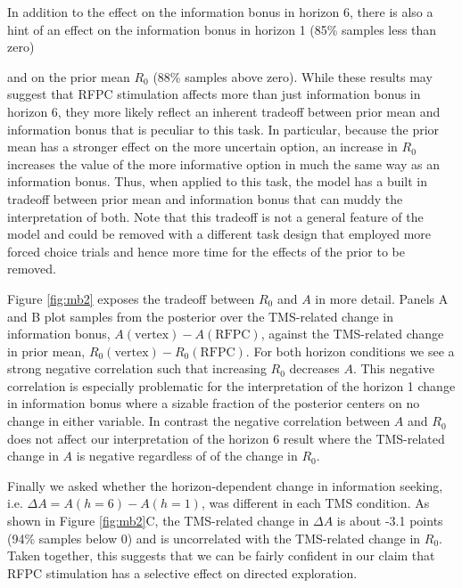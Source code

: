 \documentclass[12pt]{article}
\begin{document}
In addition to the effect on the information bonus in horizon 6, there is also a hint of an effect on the information bonus in horizon 1 (85\% samples less than zero) {\color{red} and on the prior mean $R_0$ (88\% samples above zero). While these results may suggest that RFPC stimulation affects more than just information bonus in horizon 6, they more likely reflect an inherent tradeoff between prior mean and information bonus that is peculiar to this task.  In particular, because the prior mean has a stronger effect on the more uncertain option, an increase in $R_0$ increases the value of the more informative option in much the same way as an information bonus.  Thus, when applied to this task, the model has a built in tradeoff between prior mean and information bonus that can muddy the interpretation of both.  Note that this tradeoff is not a general feature of the model and could be removed with a different task design that employed more forced choice trials and hence more time for the effects of the prior to be removed.

Figure \ref{fig:mb2} exposes the tradeoff between $R_0$ and $A$ in more detail.  Panels A and B plot samples from the posterior over the TMS-related change in information bonus, $A(\mbox{vertex}) - A(\mbox{RFPC})$, against the TMS-related change in prior mean, $R_0(\mbox{vertex}) - R_0(\mbox{RFPC})$.  For both horizon conditions we see a strong negative correlation such that increasing $R_0$ decreases $A$.  This negative correlation is especially problematic for the interpretation of the horizon 1 change in information bonus where a sizable fraction of the posterior centers on no change in either variable.  In contrast the negative correlation between $A$ and $R_0$ does not affect our interpretation of the horizon 6 result where the TMS-related change in $A$ is negative regardless of of the change in $R_0$.  

Finally  we asked whether the horizon-dependent change in information seeking, i.e. $\Delta A = A(h = 6) - A(h = 1)$, was different in each TMS condition.  As shown in Figure \ref{fig:mb2}C, the TMS-related change in $\Delta A$ is about -3.1 points (94\% samples below 0) and is uncorrelated with the TMS-related change in $R_0$.  Taken together, this suggests that we can be fairly confident in our claim that RFPC stimulation has a selective effect on directed exploration.
}
\end{document}
